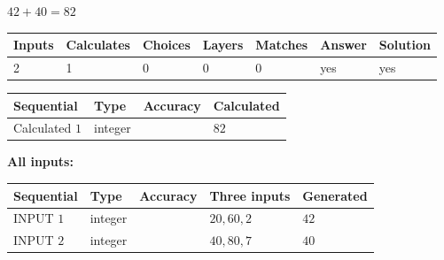 \documentclass{ctexart}
\begin{document}
$ %
42 +  %
40=   %
82$
 
 
\noindent{}
 
 

 
   
   
   
   
\noindent\begin{tabular}{|l|l|l|l|l|l|l|}
 \hline
Inputs & Calculates & Choices & Layers & Matches & Answer & Solution \\ \hline
 2  & 
 1  & 
 0
  & 
 0  & 
 0  & 
  yes & 
  yes 
  \\ \hline
 \end{tabular}
   
   
   
   
\noindent{}
   
   
  
  
\noindent\begin{tabular}{|l|l|l|l|}
\hline
 Sequential & Type & Accuracy & Calculated \\ 
\hline
 
 
  Calculated $  1 $ & integer &  & 
  $ 82 $ 
 \\  \hline  
 \end{tabular}
   
   
   
   
\noindent\vspace{0.1in}\hspace{-0.08in} {\textbf{\Large{All inputs: }}}
   
   
  
  
\noindent\begin{tabular}{|l|l|l|l|l|}
\hline
 Sequential & Type & Accuracy & Three inputs & Generated \\ 
\hline
 
 
  INPUT $  1 $ & integer &  & $
 20
 , 
 60
 , 
 2
 $ & $ 42 $ 
 \\  \hline  
 
 
  INPUT $  2 $ & integer &  & $
 40
 , 
 80
 , 
 7
 $ & $ 40 $ 
 \\  \hline  
 \end{tabular}
   
   
   
   
   
   
 \vspace{0.2in}
 
   
   
\end{document}
